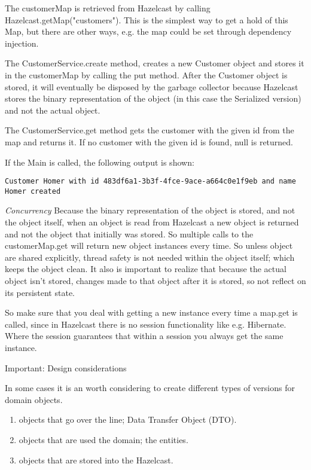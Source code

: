 The customerMap is retrieved from Hazelcast by calling Hazelcast.getMap("customers"). This is the simplest way to get a hold of this Map, but there are other ways, e.g. the map could be set through dependency injection.

The CustomerService.create method, creates a new Customer object and stores it in the customerMap by calling the put method. After the Customer object is stored, it will eventually be disposed by the garbage collector because Hazelcast stores the binary representation of the object (in this case the Serialized version) and not the actual object.

The CustomerService.get method gets the customer with the given id from the map and returns it. If no customer with the given id is found, null is returned. 

If the Main is called,  the following output is shown:
\begin{verbatim}
Customer Homer with id 483df6a1-3b3f-4fce-9ace-a664c0e1f9eb and name Homer created
\end{verbatim}	

\emph{Concurrency} Because the binary representation of the object is stored, and not the object itself, when an object is read from Hazelcast a new object is returned and not the object that initially was stored. So multiple calls to the customerMap.get will return new object instances every time. So unless object are shared explicitly, thread safety is not needed within the object itself; which keeps the object clean. It also is important to realize that because the actual object isn't stored, changes made to that object after it is stored, so not reflect on its persistent state.
 
So make sure that you deal with getting a new instance every time a map.get is called, since in Hazelcast there is no session functionality like e.g. Hibernate. Where the session guarantees that within a session you always get the same instance. 

Important: Design considerations

In some cases it is an worth considering to create different types of versions for domain objects.
\begin{enumerate}
\item objects that go over the line; Data Transfer Object (DTO).
\item objects that are used the domain; the entities.
\item objects that are stored into the Hazelcast.
\end{enumerate}

